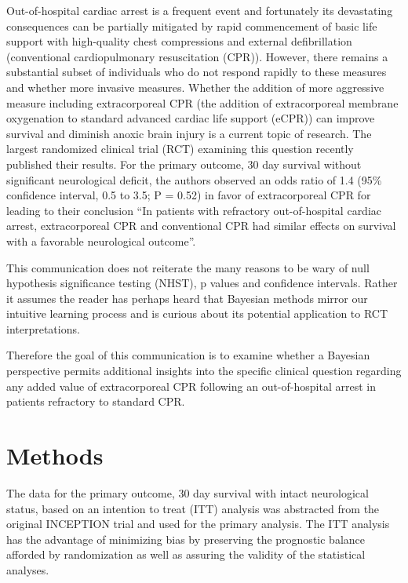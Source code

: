 \documentclass[
  super,
  preprint,
  3p]{elsarticle}
\begin{document}
Out-of-hospital cardiac arrest is a frequent event and fortunately its
devastating consequences can be partially mitigated by rapid
commencement of basic life support with high-quality chest compressions
and external defibrillation (conventional cardiopulmonary resuscitation
(CPR)). However, there remains a substantial subset of individuals who
do not respond rapidly to these measures and whether more invasive
measures. Whether the addition of more aggressive measure including
extracorporeal CPR (the addition of extracorporeal membrane oxygenation
to standard advanced cardiac life support (eCPR)) can improve survival
and diminish anoxic brain injury is a current topic of research. The
largest randomized clinical trial (RCT) examining this question recently
published their results\citep{CPR2023a}. For the primary outcome, 30 day
survival without significant neurological deficit, the authors observed
an odds ratio of 1.4 (95\% confidence interval, 0.5 to 3.5; P = 0.52) in
favor of extracorporeal CPR for leading to their conclusion ``In
patients with refractory out-of-hospital cardiac arrest, extracorporeal
CPR and conventional CPR had similar effects on survival with a
favorable neurological outcome''.\citep{CPR2023a}

This communication does not reiterate the many reasons to be wary of
null hypothesis significance testing (NHST), p values and confidence
intervals\citep{RN5420}. Rather it assumes the reader has perhaps heard
that Bayesian methods mirror our intuitive learning process and is
curious about its potential application to RCT interpretations.

Therefore the goal of this communication is to examine whether a
Bayesian perspective permits additional insights into the specific
clinical question regarding any added value of extracorporeal CPR
following an out-of-hospital arrest in patients refractory to standard
CPR.

\hypertarget{methods}{%
\section{Methods}\label{methods}}

The data for the primary outcome, 30 day survival with intact
neurological status, based on an intention to treat (ITT) analysis was
abstracted from the original INCEPTION trial \citep{CPR2023a} and used
for the primary analysis. The ITT analysis has the advantage of
minimizing bias by preserving the prognostic balance afforded by
randomization as well as assuring the validity of the statistical
analyses.
\end{document}
